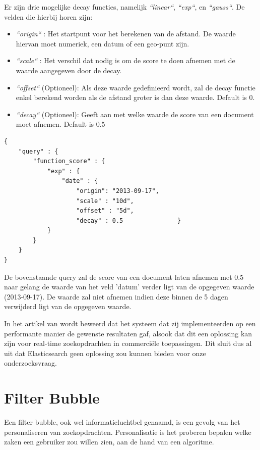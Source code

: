 Er zijn drie mogelijke decay functies, namelijk \textit{``linear``}, \textit{``exp``}, en \textit{``gauss``}. De velden die hierbij horen zijn:

\begin{itemize}
	\item \textit{``origin``} : Het startpunt voor het berekenen van de afstand. De waarde hiervan moet numeriek, een datum of een geo-punt zijn.
	\item \textit{``scale``} : Het verschil dat nodig is om de score te doen afnemen met de waarde aangegeven door de decay.
	\item \textit{``offset``} (Optioneel):  Als deze waarde gedefinieerd wordt, zal de decay functie enkel berekend worden als de afstand groter is dan deze waarde. Default is 0.
	\item \textit{``decay``} (Optioneel): Geeft aan met welke waarde de score van een document moet afnemen. Default is 0.5
\end{itemize}


\begin{lstlisting}[caption={Decay: voorbeeld van een decay functie}]
{
	"query" : {
		"function_score" : {
			"exp" : {
				"date" : {
					"origin": "2013-09-17",
					"scale" : "10d",
					"offset" : "5d",
					"decay" : 0.5				}
			}
		}
	}
}
\end{lstlisting}

De bovenstaande query zal de score van een document laten afnemen met 0.5 naar gelang de waarde van het veld 'datum' verder ligt van de opgegeven waarde (2013-09-17). De waarde zal niet afnemen indien deze binnen de 5 dagen verwijderd ligt van de opgegeven waarde.

 In het artikel van \autocite{Vavliakis2019} wordt beweerd dat het systeem dat zij implementeerden op een performante manier de gewenste resultaten gaf, alsook dat dit een oplossing kan zijn voor real-time zoekopdrachten in commerciële toepassingen. Dit sluit dus al uit dat Elasticsearch geen oplossing zou kunnen bieden voor onze onderzoeksvraag.
 
 \newpage
\section{Filter Bubble}
\label{sec:Filter Bubble}

Een filter bubble, ook wel informatieluchtbel genaamd, is een gevolg van het personaliseren van zoekopdrachten. Personalisatie is het proberen bepalen welke zaken een gebruiker zou willen zien, aan de hand van een algoritme. 

